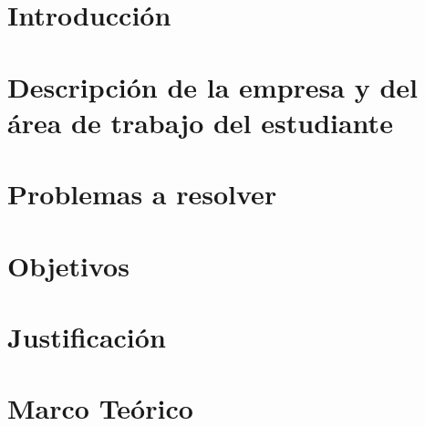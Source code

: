 \documentclass[12pt, letterpaper]{report}
\begin{document}





\clearpage
\tableofcontents
\clearpage
\listoffigures
\clearpage
\listoftables

\clearpage
{}


\chapter{Introducción}


\chapter{Descripción de la empresa y del área de trabajo del estudiante}


\chapter{Problemas a resolver}


\chapter{Objetivos}


\chapter{Justificación}



\chapter{Marco Teórico}

\end{document}
